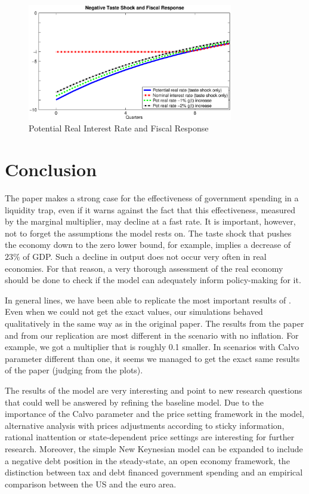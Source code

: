 \documentclass[12pt,a4paper,oneside,titlepage]{article}
\begin{document}
\begin{figure}[!th]
\centering
\includegraphics[width=0.8\textwidth]{Paperpics/Figure1a}
\caption{Potential Real Interest Rate and Fiscal Response}
\label{Figure1a}
\end{figure}








\section{Conclusion}
The paper makes a strong case for the effectiveness of government spending in a liquidity trap, even if it warns against the fact that this effectiveness, measured by the marginal multiplier, may decline at a fast rate. It is important, however, not to forget the assumptions the model rests on. The taste shock that pushes the economy down to the zero lower bound, for example, implies a decrease of $23\%$ of GDP. Such a decline in output does not occur very often in real economies. For that reason, a very thorough assessment of the real economy should be done to check if the model can adequately inform policy-making for it.
\par
\bigskip
In general lines, we have been able to replicate the most important results of \citet{Erceg.2014}. Even when we could not get the exact values, our simulations behaved qualitatively in the same way as in the original paper. The results from the paper and from our replication are most different in the scenario with no inflation. For example, we got a multiplier that is roughly 0.1 smaller. In scenarios with Calvo parameter different than one, it seems we managed to get the exact same results of the paper (judging from the plots).
\par
\bigskip
The results of the model are very interesting and point to new research questions that could well be answered by refining the baseline model. Due to the importance of the Calvo parameter and the price setting framework in the model, alternative analysis with prices adjustments according to sticky information, rational inattention or state-dependent price settings are interesting for further research. Moreover, the simple New Keynesian model can be expanded to include a negative debt position in the steady-state, an open economy framework, the distinction between tax and debt financed government spending and an empirical comparison between the US and the euro area.
\end{document}
